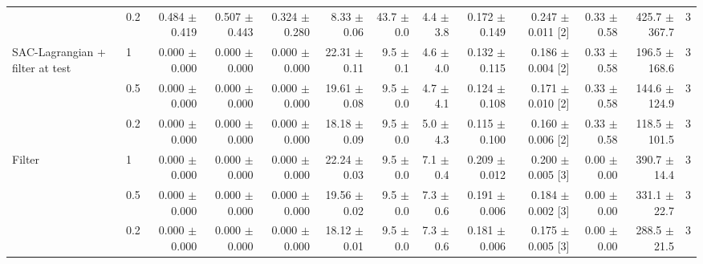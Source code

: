 {\begin{tabular}{llrrrrrrrrrrr}
 & 0.2 & 0.484 $\pm$ 0.419 & 0.507 $\pm$ 0.443 & 0.324 $\pm$ 0.280 & 8.33 $\pm$ 0.06 & 43.7 $\pm$ 0.0 & 4.4 $\pm$ 3.8 & 0.172 $\pm$ 0.149 & 0.247 $\pm$ 0.011 [2] & 0.33 $\pm$ 0.58 & 425.7 $\pm$ 367.7 & 3 \\
\addlinespace
SAC-Lagrangian + filter at test & 1 & 0.000 $\pm$ 0.000 & 0.000 $\pm$ 0.000 & 0.000 $\pm$ 0.000 & 22.31 $\pm$ 0.11 & 9.5 $\pm$ 0.1 & 4.6 $\pm$ 4.0 & 0.132 $\pm$ 0.115 & 0.186 $\pm$ 0.004 [2] & 0.33 $\pm$ 0.58 & 196.5 $\pm$ 168.6 & 3 \\
 & 0.5 & 0.000 $\pm$ 0.000 & 0.000 $\pm$ 0.000 & 0.000 $\pm$ 0.000 & 19.61 $\pm$ 0.08 & 9.5 $\pm$ 0.0 & 4.7 $\pm$ 4.1 & 0.124 $\pm$ 0.108 & 0.171 $\pm$ 0.010 [2] & 0.33 $\pm$ 0.58 & 144.6 $\pm$ 124.9 & 3 \\
 & 0.2 & 0.000 $\pm$ 0.000 & 0.000 $\pm$ 0.000 & 0.000 $\pm$ 0.000 & 18.18 $\pm$ 0.09 & 9.5 $\pm$ 0.0 & 5.0 $\pm$ 4.3 & 0.115 $\pm$ 0.100 & 0.160 $\pm$ 0.006 [2] & 0.33 $\pm$ 0.58 & 118.5 $\pm$ 101.5 & 3 \\
\addlinespace
Filter & 1 & 0.000 $\pm$ 0.000 & 0.000 $\pm$ 0.000 & 0.000 $\pm$ 0.000 & 22.24 $\pm$ 0.03 & 9.5 $\pm$ 0.0 & 7.1 $\pm$ 0.4 & 0.209 $\pm$ 0.012 & 0.200 $\pm$ 0.005 [3] & 0.00 $\pm$ 0.00 & 390.7 $\pm$ 14.4 & 3 \\
 & 0.5 & 0.000 $\pm$ 0.000 & 0.000 $\pm$ 0.000 & 0.000 $\pm$ 0.000 & 19.56 $\pm$ 0.02 & 9.5 $\pm$ 0.0 & 7.3 $\pm$ 0.6 & 0.191 $\pm$ 0.006 & 0.184 $\pm$ 0.002 [3] & 0.00 $\pm$ 0.00 & 331.1 $\pm$ 22.7 & 3 \\
 & 0.2 & 0.000 $\pm$ 0.000 & 0.000 $\pm$ 0.000 & 0.000 $\pm$ 0.000 & 18.12 $\pm$ 0.01 & 9.5 $\pm$ 0.0 & 7.3 $\pm$ 0.6 & 0.181 $\pm$ 0.006 & 0.175 $\pm$ 0.005 [3] & 0.00 $\pm$ 0.00 & 288.5 $\pm$ 21.5 & 3 \\
\bottomrule\end{tabular}}

